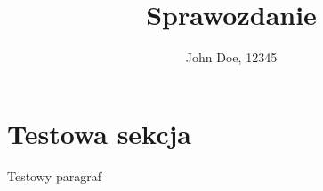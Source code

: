 \documentclass{pwszreport}
\title{Sprawozdanie}
\author{John Doe, 12345}
\begin{document}
    \maketitle

    \section{Testowa sekcja}
    Testowy paragraf
\end{document}
